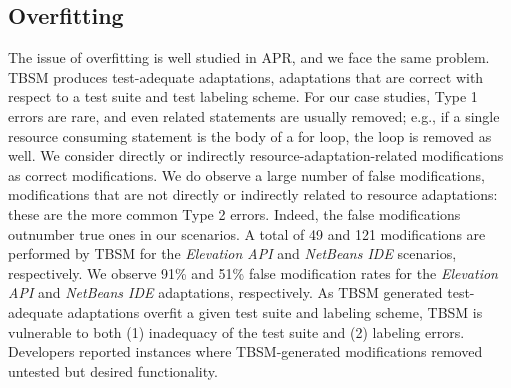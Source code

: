 \subsection{Overfitting}
The issue of overfitting is well studied in APR, and we face the same problem\cite{smith2015cwd}. TBSM produces test-adequate adaptations, adaptations that are correct with respect to a test suite and test labeling scheme. For our case studies, Type 1 errors are rare, and even related statements are usually removed; e.g., if a single resource consuming statement is the body of a for loop, the loop is removed as well. We consider directly or indirectly resource-adaptation-related modifications as correct modifications. We do observe a large number of false modifications, modifications that are not directly or indirectly related to resource adaptations: these are the more common Type 2 errors. Indeed, the false modifications outnumber true ones in our scenarios. A total of 49 and 121 modifications are performed by TBSM for the \textit{Elevation API} and \textit{NetBeans IDE} scenarios, respectively. We observe 91\% and 51\% false modification rates for the \textit{Elevation API} and \textit{NetBeans IDE} adaptations, respectively. As TBSM generated test-adequate adaptations overfit a given test suite and labeling scheme, TBSM is vulnerable to both (1) inadequacy of the test suite and (2) labeling errors. Developers reported instances where TBSM-generated modifications removed untested but desired functionality. 
